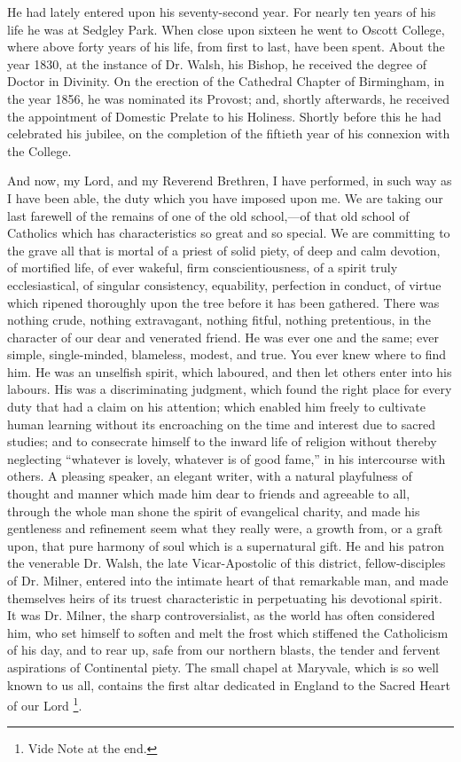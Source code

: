 He had lately entered upon his seventy-second year.
For nearly ten years of his life he was at Sedgley Park.
When close upon sixteen he went to Oscott College, where
above forty years of his life, from first to last, have
been spent. About the year 1830, at the instance of Dr.
Walsh, his Bishop, he received the degree of Doctor in
Divinity. On the erection of the Cathedral Chapter of
Birmingham, in the year 1856, he was nominated its
Provost; and, shortly afterwards, he received the
appointment of Domestic Prelate to his Holiness. Shortly
before this he had celebrated his jubilee, on the
completion of the fiftieth year of his connexion with the
College.

And now, my Lord, and my Reverend Brethren, I have
performed, in such way as I have been able, the duty
which you have imposed upon me. We are taking our last
farewell of the remains of one of the old school,—of
that old school of Catholics which has characteristics so
great and so special. We are committing to the grave all
that is mortal of a priest of solid piety, of deep and
calm devotion, of mortified life, of ever wakeful, firm
conscientiousness, of a spirit truly ecclesiastical, of
singular consistency, equability, perfection in conduct,
of virtue which ripened thoroughly upon the tree before
it has been gathered. There was nothing crude, nothing
extravagant, nothing fitful, nothing pretentious, in the
character of our dear and venerated friend. He was ever
one and the same; ever simple, single-minded, blameless,
modest, and true. You ever knew where to find him. He was
an unselfish spirit, which laboured, and then let others
enter into his labours. His was a discriminating
judgment, which found the right place for every duty that
had a claim on his attention; which enabled him freely to
cultivate human learning without its encroaching on the
time and interest due to sacred studies; and to
consecrate himself to the inward life of religion without
thereby neglecting ``whatever is lovely, whatever is
of good fame,'' in his intercourse with others. A
pleasing speaker, an elegant writer, with a natural
playfulness of thought and manner which made him dear to
friends and agreeable to all, through the whole man shone
the spirit of evangelical charity, and made his
gentleness and refinement seem what they really were, a
growth from, or a graft upon, that pure harmony of soul
which is a supernatural gift. He and his patron the
venerable Dr. Walsh, the late Vicar-Apostolic of this
district, fellow-disciples of Dr. Milner, entered into
the intimate heart of that remarkable man, and made
themselves heirs of its truest characteristic in
perpetuating his devotional spirit. It was Dr. Milner,
the sharp controversialist, as the world has often
considered him, who set himself to soften and melt the
frost which stiffened the Catholicism of his day, and to
rear up, safe from our northern blasts, the tender and
fervent aspirations of Continental piety. The small
chapel at Maryvale, which is so well known to us all,
contains the first altar dedicated in England to the
Sacred Heart of our Lord \footnote{Vide Note at the end.}.

